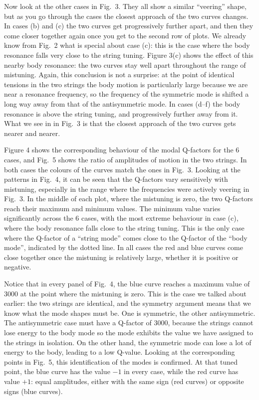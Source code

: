   Now look at the other cases in Fig.\ 3. They all show a similar ``veering'' 
  shape, but as you go through the cases the closest approach of the two curves 
  changes. In cases (b) and (c) the two curves get progressively further apart, 
  and then they come closer together again once you get to the second row of 
  plots. We already know from Fig.\ 2 what is special about case (c): this is 
  the case where the body resonance falls very close to the string tuning. 
  Figure 3(c) shows the effect of this nearby body resonance: the two curves 
  stay well apart throughout the range of mistuning. Again, this conclusion is 
  not a surprise: at the point of identical tensions in the two strings the 
  body motion is particularly large because we are near a resonance frequency, 
  so the frequency of the symmetric mode is shifted a long way away from that 
  of the antisymmetric mode. In cases (d--f) the body resonance is above the 
  string tuning, and progressively further away from it. What we see in in 
  Fig.\ 3 is that the closest approach of the two curves gets nearer and 
  nearer. 

  Figure 4 shows the corresponding behaviour of the modal Q-factors for the 6 
  cases, and Fig.\ 5 shows the ratio of amplitudes of motion in the two 
  strings. In both cases the colours of the curves match the ones in Fig.\ 3. 
  Looking at the patterns in Fig.\ 4, it can be seen that the Q-factors vary 
  sensitively with mistuning, especially in the range where the frequencies 
  were actively veering in Fig.\ 3. In the middle of each plot, where the 
  mistuning is zero, the two Q-factors reach their maximum and minimum values. 
  The minimum value varies significantly across the 6 cases, with the most 
  extreme behaviour in case (c), where the body resonance falls close to the 
  string tuning. This is the only case where the Q-factor of a ``string mode'' 
  comes close to the Q-factor of the ``body mode'', indicated by the dotted 
  line. In all cases the red and blue curves come close together once the 
  mistuning is relatively large, whether it is positive or negative. 

  Notice that in every panel of Fig.\ 4, the blue curve reaches a maximum value 
  of 3000 at the point where the mistuning is zero. This is the case we talked 
  about earlier: the two strings are identical, and the symmetry argument means 
  that we know what the mode shapes must be. One is symmetric, the other 
  antisymmetric. The antisymmetric case must have a Q-factor of 3000, because 
  the strings cannot lose energy to the body mode so the mode exhibits the 
  value we have assigned to the strings in isolation. On the other hand, the 
  symmetric mode can lose a lot of energy to the body, leading to a low 
  Q-value. Looking at the corresponding points in Fig.\ 5, this identification 
  of the modes is confirmed. At that tuned point, the blue curve has the value 
  $-1$ in every case, while the red curve has value $+1$: equal amplitudes, 
  either with the same sign (red curves) or opposite signs (blue curves). 


